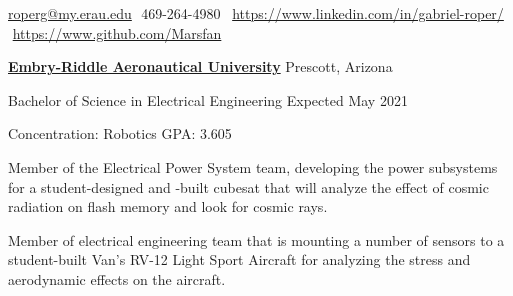 \documentclass[letterpaper,ddMMMyyyy,nonstopmode]{simpleresumecv}
\makeatletter
\newcommand{\CVAuthor}{Gabriel Roper}
\newcommand{\LinkedInPage}{https://www.linkedin.com/in/gabriel-roper/}
\newcommand{\GithubPage}{https://www.github.com/Marsfan}
\newcommand{\emailAddress}{roperg@my.erau.edu}
\newcommand{\streetAddress}{}
\newcommand{\phoneNumber}{469-264-4980}
\makeatother
\begin{document}
	\Title{\CVAuthor}

	\begin{SubTitle}
		{\streetAddress}
		\par
		\href{mailto:\emailAddress}{\emailAddress}
		\BulletSymbol
		\,\,\phoneNumber\,
		\BulletSymbol
		\,\,\href{\LinkedInPage}{\url{\LinkedInPage}}
		\BulletSymbol
		\,\,\href{\GithubPage}{\url{\GithubPage}}
	\end{SubTitle}

	\begin{Body}



            \Entry
            \href{https://prescott.erau.edu}{\textbf{Embry-Riddle Aeronautical University}}
            \hfill Prescott, Arizona

            Bachelor of Science in Electrical Engineering
            \hfill Expected May 2021

            Concentration: Robotics
            \hfill GPA: 3.605





                {Member of the Electrical Power System team, developing the
                    power subsystems for a student-designed and -built
                    cubesat that will analyze the effect of cosmic radiation on
                    flash memory and look for cosmic rays.}

                {Member of electrical engineering team that is mounting a number of sensors
                    to a student-built Van's RV-12 Light Sport Aircraft for analyzing the
                    stress and aerodynamic effects on the aircraft.}



\end{Body}
\end{document}
